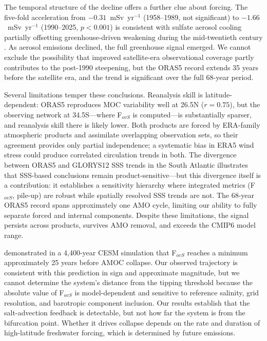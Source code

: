 \documentclass{agujournal2019}
\begin{document}
The temporal structure of the decline offers a further clue about forcing. The five-fold acceleration from $-0.31$~mSv~yr$^{-1}$ (1958--1989, not significant) to $-1.66$~mSv~yr$^{-1}$ (1990--2025, $p < 0.001$) is consistent with sulfate aerosol cooling partially offsetting greenhouse-driven weakening during the mid-twentieth century \cite{Booth2012}. As aerosol emissions declined, the full greenhouse signal emerged. We cannot exclude the possibility that improved satellite-era observational coverage partly contributes to the post-1990 steepening, but the ORAS5 record extends 35 years before the satellite era, and the trend is significant over the full 68-year period.

Several limitations temper these conclusions. Reanalysis skill is latitude-dependent: ORAS5 reproduces MOC variability well at 26.5\textdegree N ($r = 0.75$), but the observing network at 34.5\textdegree S---where F$_{ovS}$ is computed---is substantially sparser, and reanalysis skill there is likely lower. Both products are forced by ERA-family atmospheric products and assimilate overlapping observation sets, so their agreement provides only partial independence; a systematic bias in ERA5 wind stress could produce correlated circulation trends in both. The divergence between ORAS5 and GLORYS12 SSS trends in the South Atlantic illustrates that SSS-based conclusions remain product-sensitive---but this divergence itself is a contribution: it establishes a sensitivity hierarchy where integrated metrics (F$_{ovS}$, pile-up) are robust while spatially resolved SSS trends are not. The 68-year ORAS5 record spans approximately one AMO cycle, limiting our ability to fully separate forced and internal components. Despite these limitations, the signal persists across products, survives AMO removal, and exceeds the CMIP6 model range.

 demonstrated in a 4,400-year CESM simulation that F$_{ovS}$ reaches a minimum approximately 25 years before AMOC collapse. Our observed trajectory is consistent with this prediction in sign and approximate magnitude, but we cannot determine the system's distance from the tipping threshold because the absolute value of F$_{ovS}$ is model-dependent and sensitive to reference salinity, grid resolution, and barotropic component inclusion. Our results establish that the salt-advection feedback is detectable, but not how far the system is from the bifurcation point. Whether it drives collapse depends on the rate and duration of high-latitude freshwater forcing, which is determined by future emissions.
\end{document}
